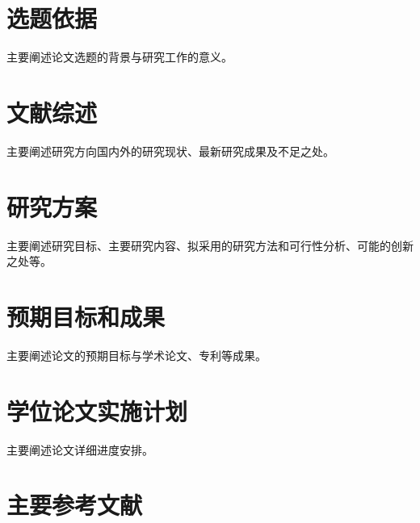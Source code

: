 \documentclass[master,openright,AutoFakeBold=true]{buaathesisproposal}
\begin{document}


\maketitle
\makecontents

\pagestyle{mainmatter}

\section{选题依据}
主要阐述论文选题的背景与研究工作的意义。
\section{文献综述}
主要阐述研究方向国内外的研究现状、最新研究成果及不足之处。
\section{研究方案}
主要阐述研究目标、主要研究内容、拟采用的研究方法和可行性分析、可能的创新之处等。
\section{预期目标和成果}
主要阐述论文的预期目标与学术论文、专利等成果。
\section{学位论文实施计划}
主要阐述论文详细进度安排。
\section{主要参考文献}
\nocite{*}

\end{document}
